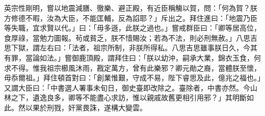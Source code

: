 \begin{pinyinscope}
 英宗性剛明，嘗以地震減膳、徹樂、避正殿，有近臣稱觴以賀，問：「何為賀？朕方修德不暇，汝為大臣，不能匡輔，反為諂耶？」斥出之。拜住進曰：「地震乃臣等失職，宜求賢以代。」曰：「毋多遜，此朕之過也。」嘗戒群臣曰：「卿等居高位，食厚祿，當勉力圖報。茍或貧乏，朕不惜賜汝；若為不法，則必刑無赦。」八思吉思下獄，謂左右曰：「法者，祖宗所制，非朕所得私。八思吉思雖事朕日久，今其有罪，當論如法。」嘗御鹿頂殿，謂拜住曰：「朕以幼沖，嗣承大業，錦衣玉食，何求不得。惟我祖宗櫛風沐雨，戡定萬方，曾有此樂邪？卿元勛之裔，當體朕至懷，毋忝爾祖。」拜住頓首對曰：「創業惟艱，守成不易，陛下睿思及此，億兆之福也。」又謂大臣曰：「中書選人署事未旬日，御史臺即改除之。臺除者，中書亦然。今山林之下，遺逸良多，卿等不能盡心求訪，惟以親戚故舊更相引用邪？」其明斷如此。然以果於刑戮，奸黨畏誅，遂構大變雲。



\end{pinyinscope}